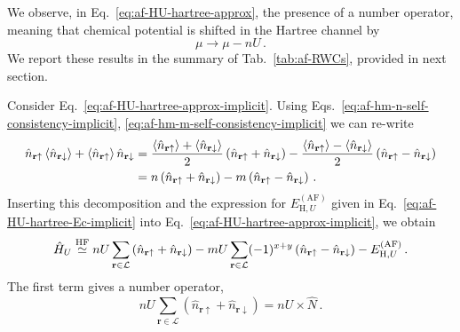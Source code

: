 We observe, in Eq.~\eqref{eq:af-HU-hartree-approx}, the presence of a number operator, meaning that chemical potential is shifted in the Hartree channel by
\begin{equation}\label{eq:af-mu-hU}
	\mu \to \mu - nU \, .
\end{equation}
We report these results in the summary of Tab.~\ref{tab:af-RWCs}, provided in next section.

\begin{tabproof}
	
	Consider Eq.~\eqref{eq:af-HU-hartree-approx-implicit}. Using Eqs.~\eqref{eq:af-hm-n-self-consistency-implicit}, \eqref{eq:af-hm-m-self-consistency-implicit} we can re-write
	\[
	\begin{aligned}
		\hat n_{\mathbf{r}\uparrow} \ev{\hat n_{\mathbf{r}\downarrow}} + \ev{\hat n_{\mathbf{r}\uparrow}} \hat n_{\mathbf{r}\downarrow}
		&= \frac{\ev{\hat n_{\mathbf{r}\uparrow}} + \ev{\hat n_{\mathbf{r}\downarrow}}}{2} \left(
		\hat n_{\mathbf{r}\uparrow} + \hat n_{\mathbf{r}\downarrow}
		\right) - \frac{\ev{\hat n_{\mathbf{r}\uparrow}} - \ev{\hat n_{\mathbf{r}\downarrow}}}{2} \left(
		\hat n_{\mathbf{r}\uparrow} - \hat n_{\mathbf{r}\downarrow}
		\right) \\
		&= n \left(
		\hat n_{\mathbf{r}\uparrow} + \hat n_{\mathbf{r}\downarrow}
		\right) - m \left(
		\hat n_{\mathbf{r}\uparrow} - \hat n_{\mathbf{r}\downarrow}
		\right) \, .
	\end{aligned}
	\]
	Inserting this decomposition and the expression for $E_{\mathrm{H},U}^{(\mathrm{AF})}$ given in Eq.~\eqref{eq:af-HU-hartree-Ec-implicit} into Eq.~\eqref{eq:af-HU-hartree-approx-implicit}, we obtain
	\begin{equation} \label{eq:af-HU-hartree-Ec-implicit-int1}
		\hat H_U \stackrel{\mathrm{HF}}{\simeq} nU \sum_{\mathbf{r}\in\mathcal{L}} \left(
		\hat n_{\mathbf{r}\uparrow} + \hat n_{\mathbf{r}\downarrow}
		\right) - mU \sum_{\mathbf{r}\in\mathcal{L}} (-1)^{x+y} \left(
		\hat n_{\mathbf{r}\uparrow} - \hat n_{\mathbf{r}\downarrow}
		\right) - E_{\mathrm{H},U}^{(\mathrm{AF})} \, .
	\end{equation}
	The first term gives a number operator,
	\[
	nU \sum_{\mathbf{r}\in\mathcal{L}} \left(
	\hat n_{\mathbf{r}\uparrow} + \hat n_{\mathbf{r}\downarrow}
	\right) = nU \times \hat N \, .
	\]
	

\end{tabproof}
